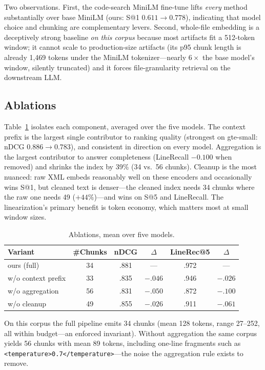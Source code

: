 \documentclass[conference]{IEEEtran}
\begin{document}
Two observations. First, the code-search MiniLM fine-tune lifts \emph{every} method substantially over base MiniLM (ours: S@1 $0.611 \rightarrow 0.778$), indicating that model choice and chunking are complementary levers. Second, whole-file embedding is a deceptively strong baseline \emph{on this corpus} because most artifacts fit a 512-token window; it cannot scale to production-size artifacts (its p95 chunk length is already 1{,}469 tokens under the MiniLM tokenizer---nearly $6\times$ the base model's window, silently truncated) and it forces file-granularity retrieval on the downstream LLM.

\subsection{Ablations}
Table~\ref{tab:ablations} isolates each component, averaged over the five models. The context prefix is the largest single contributor to ranking quality (strongest on gte-small: nDCG $0.886 \rightarrow 0.783$), and consistent in direction on every model. Aggregation is the largest contributor to answer completeness (LineRecall $-0.100$ when removed) and shrinks the index by 39\% (34 vs.\ 56 chunks). Cleanup is the most nuanced: raw XML embeds reasonably well on these encoders and occasionally wins S@1, but cleaned text is denser---the cleaned index needs 34 chunks where the raw one needs 49 ($+44\%$)---and wins on S@5 and LineRecall. The linearization's primary benefit is token economy, which matters most at small window sizes.

\begin{table}[t]
\caption{Ablations, mean over five models.}
\label{tab:ablations}
\centering
\begin{tabular}{lccccc}
\toprule
Variant & \#Chunks & nDCG & $\Delta$ & LineRec@5 & $\Delta$ \\
\midrule
ours (full)        & 34 & .881 & --- & .972 & --- \\
w/o context prefix & 33 & .835 & $-.046$ & .946 & $-.026$ \\
w/o aggregation    & 56 & .831 & $-.050$ & .872 & $-.100$ \\
w/o cleanup        & 49 & .855 & $-.026$ & .911 & $-.061$ \\
\bottomrule
\end{tabular}
\end{table}

On this corpus the full pipeline emits 34 chunks (mean 128 tokens, range 27--252, all within budget---an enforced invariant). Without aggregation the same corpus yields 56 chunks with mean 89 tokens, including one-line fragments such as \texttt{<temperature>0.7</temperature>}---the noise the aggregation rule exists to remove.
\end{document}

